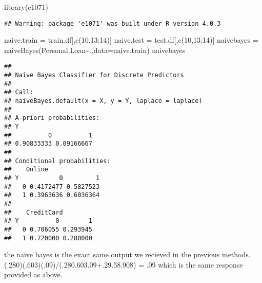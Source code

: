 \documentclass[
]{article}
\newenvironment{Shaded}{\begin{snugshade}}{\end{snugshade}}
\newcommand{\AttributeTok}[1]{\textcolor[rgb]{0.77,0.63,0.00}{#1}}
\newcommand{\DecValTok}[1]{\textcolor[rgb]{0.00,0.00,0.81}{#1}}
\newcommand{\FunctionTok}[1]{\textcolor[rgb]{0.00,0.00,0.00}{#1}}
\newcommand{\NormalTok}[1]{#1}
\newcommand{\OtherTok}[1]{\textcolor[rgb]{0.56,0.35,0.01}{#1}}
\newcommand{\SpecialCharTok}[1]{\textcolor[rgb]{0.00,0.00,0.00}{#1}}
\newcommand{\StringTok}[1]{\textcolor[rgb]{0.31,0.60,0.02}{#1}}
\begin{document}
\begin{Shaded}
\begin{Highlighting}[]
\FunctionTok{library}\NormalTok{(}\StringTok{\textquotesingle{}e1071\textquotesingle{}}\NormalTok{)}
\end{Highlighting}
\end{Shaded}

\begin{verbatim}
## Warning: package 'e1071' was built under R version 4.0.3
\end{verbatim}

\begin{Shaded}
\begin{Highlighting}[]
\NormalTok{naive.train }\OtherTok{=}\NormalTok{ train.df[,}\FunctionTok{c}\NormalTok{(}\DecValTok{10}\NormalTok{,}\DecValTok{13}\SpecialCharTok{:}\DecValTok{14}\NormalTok{)]}
\NormalTok{naive.test }\OtherTok{=}\NormalTok{ test.df[,}\FunctionTok{c}\NormalTok{(}\DecValTok{10}\NormalTok{,}\DecValTok{13}\SpecialCharTok{:}\DecValTok{14}\NormalTok{)]}
\NormalTok{naivebayes }\OtherTok{=} \FunctionTok{naiveBayes}\NormalTok{(Personal.Loan}\SpecialCharTok{\textasciitilde{}}\NormalTok{.,}\AttributeTok{data=}\NormalTok{naive.train)}
\NormalTok{naivebayes}
\end{Highlighting}
\end{Shaded}

\begin{verbatim}
## 
## Naive Bayes Classifier for Discrete Predictors
## 
## Call:
## naiveBayes.default(x = X, y = Y, laplace = laplace)
## 
## A-priori probabilities:
## Y
##          0          1 
## 0.90833333 0.09166667 
## 
## Conditional probabilities:
##    Online
## Y           0         1
##   0 0.4172477 0.5827523
##   1 0.3963636 0.6036364
## 
##    CreditCard
## Y          0        1
##   0 0.706055 0.293945
##   1 0.720000 0.280000
\end{verbatim}

the naive bayes is the exact same output we recieved in the previous
methods. (.280)(.603)(.09)/(.280.603.09+.29.58.908) = .09 which is the
same response provided as above.
\end{document}
